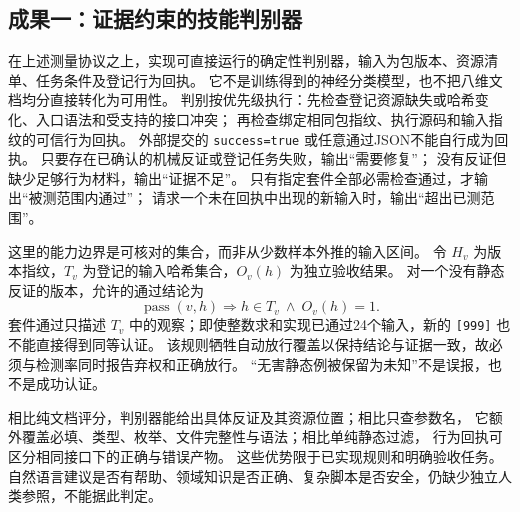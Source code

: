 \subsection{成果一：证据约束的技能判别器}
\label{sec:decision-method}
在上述测量协议之上，实现可直接运行的确定性判别器，输入为包版本、资源清单、任务条件及登记行为回执。
它不是训练得到的神经分类模型，也不把八维文档均分直接转化为可用性。
判别按优先级执行：先检查登记资源缺失或哈希变化、入口语法和受支持的接口冲突；
再检查绑定相同包指纹、执行源码和输入指纹的可信行为回执。
外部提交的 \texttt{success=true} 或任意通过JSON不能自行成为回执。
只要存在已确认的机械反证或登记任务失败，输出“需要修复”；
没有反证但缺少足够行为材料，输出“证据不足”。
只有指定套件全部必需检查通过，才输出“被测范围内通过”；
请求一个未在回执中出现的新输入时，输出“超出已测范围”。

这里的能力边界是可核对的集合，而非从少数样本外推的输入区间。
令 $H_v$ 为版本指纹，$T_v$ 为登记的输入哈希集合，$O_v(h)$ 为独立验收结果。
对一个没有静态反证的版本，允许的通过结论为
\begin{equation}
\operatorname{pass}(v,h)\Rightarrow h\in T_v\ \land\ O_v(h)=1.
\end{equation}
套件通过只描述 $T_v$ 中的观察；即使整数求和实现已通过24个输入，新的
\texttt{[999]} 也不能直接得到同等认证。
该规则牺牲自动放行覆盖以保持结论与证据一致，故必须与检测率同时报告弃权和正确放行。
“无害静态例被保留为未知”不是误报，也不是成功认证。

相比纯文档评分，判别器能给出具体反证及其资源位置；相比只查参数名，
它额外覆盖必填、类型、枚举、文件完整性与语法；相比单纯静态过滤，
行为回执可区分相同接口下的正确与错误产物。
这些优势限于已实现规则和明确验收任务。
自然语言建议是否有帮助、领域知识是否正确、复杂脚本是否安全，仍缺少独立人类参照，不能据此判定。

